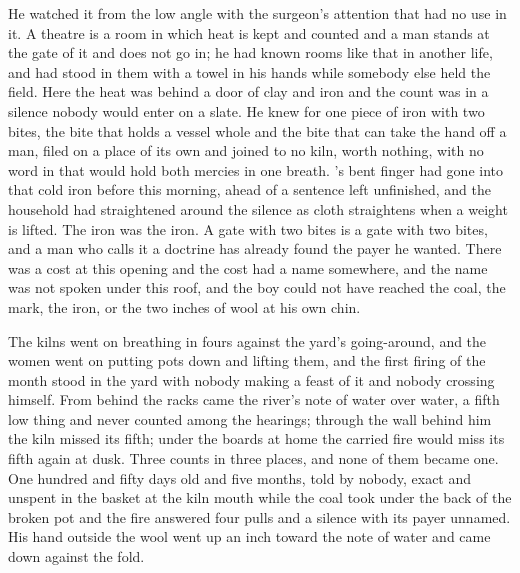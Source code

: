 He watched it from the low angle with the surgeon's attention that had no use in it. A theatre is a room in which heat is kept and counted and a man stands at the gate of it and does not go in; he had known rooms like that in another life, and had stood in them with a towel in his hands while somebody else held the field. Here the heat was behind a door of clay and iron and the count was in a silence nobody would enter on a slate. He knew  for one piece of iron with two bites, the bite that holds a vessel whole and the bite that can take the hand off a man, filed on a place of its own and joined to no kiln, worth nothing, with no word in  that would hold both mercies in one breath. 's bent finger had gone into that cold iron before this morning, ahead of a sentence left unfinished, and the household had straightened around the silence as cloth straightens when a weight is lifted. The iron was the iron. A gate with two bites is a gate with two bites, and a man who calls it a doctrine has already found the payer he wanted. There was a cost at this opening and the cost had a name somewhere, and the name was not spoken under this roof, and the boy could not have reached the coal, the mark, the iron, or the two inches of wool at his own chin.

The kilns went on breathing in fours against the yard's going-around, and the women went on putting pots down and lifting them, and the first firing of the month stood in the yard with nobody making a feast of it and nobody crossing himself. From behind the racks came the river's note of water over water, a fifth low thing and never counted among the hearings; through the wall behind him the kiln missed its fifth; under the boards at home the carried fire would miss its fifth again at dusk. Three counts in three places, and none of them became one. One hundred and fifty days old and five months, told by nobody, exact and unspent in the basket at the kiln mouth while the coal took under the back of the broken pot and the fire answered four pulls and a silence with its payer unnamed. His hand outside the wool went up an inch toward the note of water and came down against the fold.
